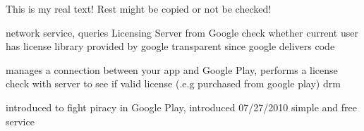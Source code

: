This is my real text! Rest might be copied or not be checked!

%
network service, queries Licensing Server from Google
check whether current user has license
library provided by google
transparent since google delivers code

\cite{munteanLicense}
%

%
manages a connection between your app and Google Play, performs a license check with server to see if valid license (.e.g purchased from google play)
\gls{drm}
\cite{digipomLvl}
%

%
introduced to fight piracy in Google Play, introduced 07/27/2010
simple and free service
\cite{developersLicensingBlog}
%
